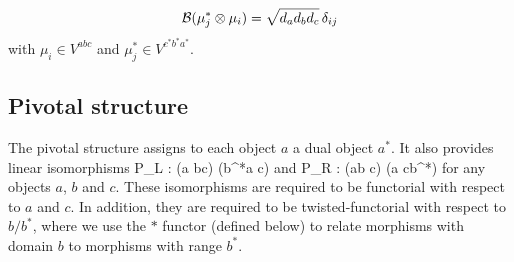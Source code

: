 \begin{align}  \label{b_pairing_defn}
\mathcal{B}( \mu_j^* \otimes \mu_i )  = \sqrt{d_a d_b d_c} \, \delta_{ij}
\end{align} 
with $\mu_i \in V^{abc}$ and $\mu_j^* \in V^{c^* b^* a^*}$.

\subsection{Pivotal structure}  \label{pivotal_ss}   \label{pivotal_structure} 

The pivotal structure assigns to each object $a$ a dual object $a^*$.
It also provides linear isomorphisms
\be
	P_L : \mor(a \to b\tp c) \to \mor(b^*\tp a \to c)
\ee
and
\be
	P_R : \mor(a\tp b \to c) \to \mor(a \to c\tp b^*)
\ee
for any objects $a$, $b$ and $c$.
These isomorphisms are required to be functorial with respect to $a$ and $c$.
In addition, they are required to be twisted-functorial with respect to $b/b^*$, where we use the 
$*$ functor (defined below) to relate morphisms with domain $b$ to morphisms with range $b^*$.

